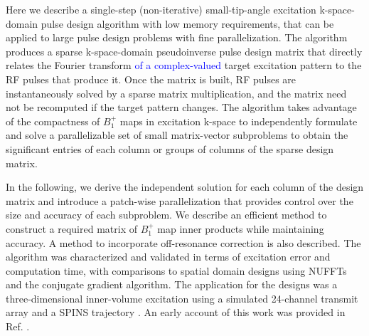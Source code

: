 \par Here we describe a single-step (non-iterative) small-tip-angle excitation k-space-domain 
pulse design algorithm with low memory requirements, 
that can be applied to large pulse design problems with fine parallelization. 
The algorithm produces a sparse k-space-domain pseudoinverse pulse design matrix 
that directly relates the Fourier transform \textcolor{blue}{of a complex-valued} target excitation pattern to the RF pulses that produce it.
Once the matrix is built, 
RF pulses are instantaneously solved by a sparse matrix multiplication,
and the matrix need not be recomputed if the target pattern changes.
The algorithm takes advantage of the compactness of $B_1^+$ maps in excitation k-space
to independently formulate and solve a parallelizable set of small matrix-vector subproblems 
to obtain the significant entries of each column or groups of columns of the sparse design matrix.  

\par In the following, 
we derive the independent solution for each column of the design matrix 
and introduce a patch-wise parallelization that provides control over the size and accuracy of each subproblem. 
We describe an efficient method to construct a required
matrix of $B_1^+$ map inner products while maintaining accuracy. 
A method to incorporate off-resonance correction is also described. 
The algorithm was characterized and validated in terms of excitation error 
and computation time, with comparisons to spatial domain designs using 
NUFFTs and the conjugate gradient algorithm.
The application for the designs was a three-dimensional inner-volume excitation using a simulated 24-channel transmit array
and a SPINS trajectory \cite{malik2012tailored}.
An early account of this work was provided in Ref. \cite{grissom:ismrm18}.

